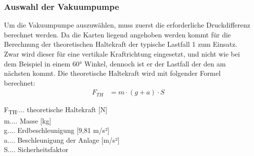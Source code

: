 \subsubsection{Auswahl der Vakuumpumpe}
Um die Vakuumpumpe auszuwählen, muss zuerst die erforderliche Druckdifferenz berechnet werden.
Da die Karten liegend angehoben werden kommt für die Berechnung der theoretischen Haltekraft der typische Lastfall 1
zum Einsatz. Zwar wird dieser für eine vertikale Kraftrichtung eingesetzt, und nicht wie bei dem Beispiel in einem
60° Winkel, dennoch ist er der Lastfall der den am nächsten kommt.
Die theoretische Haltekraft wird mit folgender Formel berechnet:
\begin{align*}
    F_{TH} &= m \cdot (g + a) \cdot S
\end{align*}

F\textsubscript{TH}.... theoretische Haltekraft [N] \\
m.... Masse [kg]\\
g.... Erdbeschleunigung [9,81 m/s²]\\
a.... Beschleunigung der Anlage [m/s²]\\
S.... Sicherheitsfaktor \\

